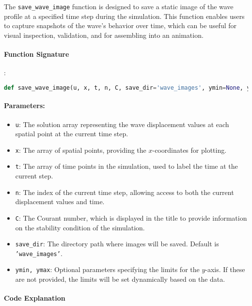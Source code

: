 \documentclass{article}
\begin{document}
			The \texttt{save\_wave\_image} function is designed to save a static image of the wave profile at a specified time step during the simulation. This function enables users to capture snapshots of the wave's behavior over time, which can be useful for visual inspection, validation, and for assembling into an animation.
			
			\paragraph{Function Signature}
			:
			\begin{lstlisting}[language=Python, caption=Function Definition]
				def save_wave_image(u, x, t, n, C, save_dir='wave_images', ymin=None, ymax=None):
			\end{lstlisting}
			
			\paragraph{Parameters:}
			\begin{itemize}
				\item \texttt{u}: The solution array representing the wave displacement values at each spatial point at the current time step.
				\item \texttt{x}: The array of spatial points, providing the $x$-coordinates for plotting.
				\item \texttt{t}: The array of time points in the simulation, used to label the time at the current step.
				\item \texttt{n}: The index of the current time step, allowing access to both the current displacement values and time.
				\item \texttt{C}: The Courant number, which is displayed in the title to provide information on the stability condition of the simulation.
				\item \texttt{save\_dir}: The directory path where images will be saved. Default is \texttt{'wave\_images'}.
				\item \texttt{ymin, ymax}: Optional parameters specifying the limits for the $y$-axis. If these are not provided, the limits will be set dynamically based on the data.
			\end{itemize}
			
			\paragraph{Code Explanation}
			
\end{document}
